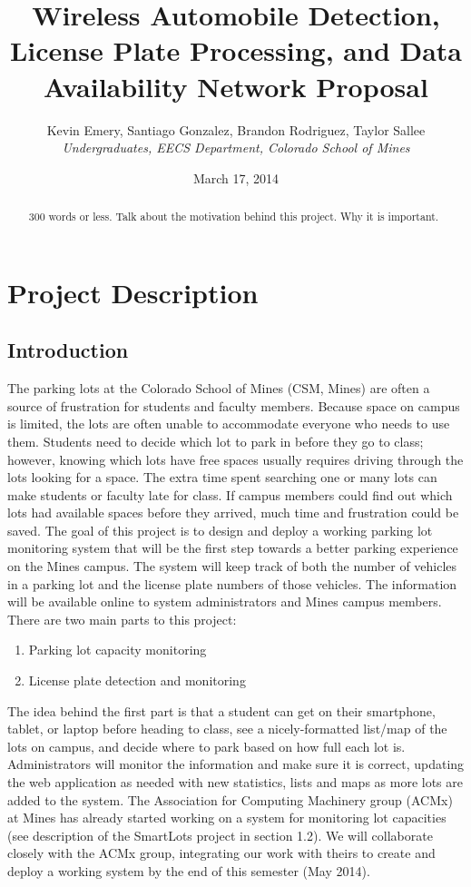 \documentclass[11pt, oneside, fullpage, doublespace]{article}
\title{Wireless Automobile Detection, License Plate Processing, and Data Availability Network Proposal}
\author{Kevin Emery, Santiago Gonzalez, Brandon Rodriguez, Taylor Sallee\\ \emph{Undergraduates, EECS Department, Colorado School of Mines}}
\date{March 17, 2014}
\begin{document}
\maketitle

\begin{abstract}
300 words or less. Talk about the motivation behind this project. Why it is important.
\end{abstract}

\section{Project Description}

\subsection{Introduction}

The parking lots at the Colorado School of Mines (CSM, Mines) are often a source of frustration for students and faculty members. Because space on campus is limited, the lots are often unable to accommodate everyone who needs to use them. Students need to decide which lot to park in before they go to class; however, knowing which lots have free spaces usually requires driving through the lots looking for a space. The extra time spent searching one or many lots can make students or faculty late for class. If campus members could find out which lots had available spaces before they arrived, much time and frustration could be saved. The goal of this project is to design and deploy a working parking lot monitoring system that will be the first step towards a better parking experience on the Mines campus. The system will keep track of both the number of vehicles in a parking lot and the license plate numbers of those vehicles. The information will be available online to system administrators and Mines campus members. There are two main parts to this project:

\begin{enumerate}
\item Parking lot capacity monitoring
\item License plate detection and monitoring
\end{enumerate}

The idea behind the first part is that a student can get on their smartphone, tablet, or laptop before heading to class, see a nicely-formatted list/map of the lots on campus, and decide where to park based on how full each lot is. Administrators will monitor the information and make sure it is correct, updating the web application as needed with new statistics, lists and maps as more lots are added to the system. The Association for Computing Machinery group (ACMx) at Mines has already started working on a system for monitoring lot capacities (see description of the SmartLots project in section 1.2). We will collaborate closely with the ACMx group, integrating our work with theirs to create and deploy a working system by the end of this semester (May 2014).
\end{document}
